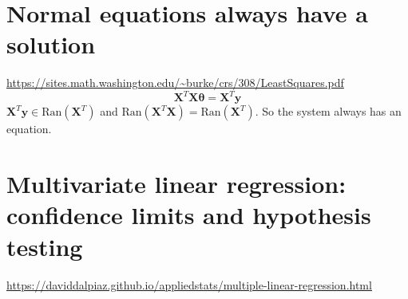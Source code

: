 \documentclass{article}
\newcommand{\beq}{\begin{equation}}
\newcommand{\eeq}{\end{equation}}
\begin{document}
\section{Normal equations always have a solution}
\url{https://sites.math.washington.edu/~burke/crs/308/LeastSquares.pdf}
\beq
\pmb{X}^T\pmb{X}\pmb{\theta} = \pmb{X}^T\pmb{y}
\eeq
$\pmb{X}^T\pmb{y} \in \text{Ran}({\pmb{X}^T})$  and $\text{Ran}(\pmb{X}^T\pmb{X})=\text{Ran}(\pmb{X}^T)$. So the system always has an equation. 
%
%
%
\section{Multivariate linear regression: confidence limits and hypothesis testing}
\url{https://daviddalpiaz.github.io/appliedstats/multiple-linear-regression.html}
%
%
%
\end{document}
